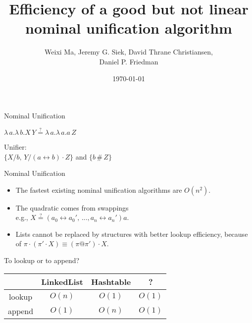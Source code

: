 \documentclass[pdf]{beamer}
\date{\today}
\title{Efficiency of a good but not linear nominal unification algorithm}
\author{Weixi Ma, Jeremy G. Siek, David Thrane Christiansen,\\ Daniel P. Friedman}
\newcommand{\bd}[2] {
 #1/ #2
}
\newcommand{\app}[2] {
#1\, #2
}
\newcommand{\swap}[2] {
  #1\leftrightarrow#2
}
\newcommand{\eqha}[2] {
  #1\stackrel{?}{=}#2
}
\begin{document}


\begin{frame}
  \maketitle
\end{frame}

\begin{frame}{Nominal Unification~\citep{urban_nominal_2004}}
  
  {\centering
    $\lambda\,a.\lambda\,b.\app{X}{Y} \stackrel{?}{=} \lambda\,a.\lambda\,a.\app{a}{Z}$
    \par}
  \vspace{1cm}
  {\centering
    Unifier:\\
    $\{\bd{X}{b},\,\bd{Y}{(\swap{a}{b})\cdot Z}\}$ and $\{b\,\#\,Z\}$
    \par}
\end{frame}

\begin{frame}{Nominal Unification~\citep{urban_nominal_2004}}

  {\centering
    \begin{itemize}
    \item The fastest existing nominal unification algorithms are $O(n^2)$.
    \item The quadratic comes from swappings \\
      e.g., $\eqha{X}{(\swap{a_0}{a_0'},\,...,\swap{a_n}{a_n'})a}$.
    \item Lists cannot be replaced by structures with better lookup efficiency,
      because of $\pi\cdot(\pi'\cdot X) \equiv (\pi@\pi')\cdot X$.
    \end{itemize}
   \par}
\end{frame}

\begin{frame}{To lookup or to append?}

  {\centering
    \begin{tabular}{|c|c|c|c|}
      \hline
      & LinkedList & Hashtable & ?\\
      \hline
      lookup & $O(n)$ & $O(1)$ & $O(1)$\\
      \hline
      append & $O(1)$ & $O(n)$ & $O(1)$\\
      \hline
    \end{tabular}
  \par}
\end{frame}
\end{document}
